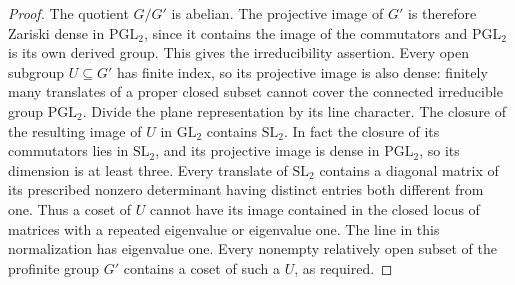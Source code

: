\documentclass[a4paper,11pt]{article}
\theoremstyle{definition}
\theoremstyle{remark}
\numberwithin{equation}{section}
\begin{document}
\begin{proof}
The quotient \(G/G'\) is abelian. The projective image of
\(G'\) is therefore Zariski dense in \(\mathrm{PGL}_2\), since
it contains the image of the commutators and \(\mathrm{PGL}_2\)
is its own derived group. This gives the irreducibility
assertion. Every open subgroup \(U\subseteq G'\) has finite
index, so its projective image is also dense: finitely many
translates of a proper closed subset cannot cover the connected
irreducible group \(\mathrm{PGL}_2\). Divide the plane
representation by its line character. The closure of the
resulting image of \(U\) in \(\mathrm{GL}_2\) contains
\(\mathrm{SL}_2\). In fact the closure of its commutators lies
in \(\mathrm{SL}_2\), and its projective image is dense in
\(\mathrm{PGL}_2\), so its dimension is at least three.
Every translate of \(\mathrm{SL}_2\) contains a diagonal matrix
of its prescribed nonzero determinant having distinct entries
both different from one. Thus a coset of \(U\) cannot have
its image contained in the closed locus of matrices with a
repeated eigenvalue or eigenvalue one. The line in this
normalization has eigenvalue one. Every nonempty relatively
open subset of the profinite group \(G'\) contains a coset
of such a \(U\), as required.
\end{proof}
\end{document}
